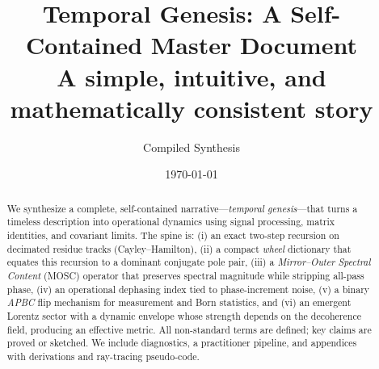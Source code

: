 \documentclass[12pt]{article}
\title{\bf Temporal Genesis: A Self-Contained Master Document\\
\large A simple, intuitive, and mathematically consistent story}
\author{Compiled Synthesis}
\date{\today}
\theoremstyle{definition}
\begin{document}
\maketitle
\tableofcontents

\begin{abstract}
We synthesize a complete, self-contained narrative---\emph{temporal genesis}---that turns a timeless description into operational dynamics using signal processing, matrix identities, and covariant limits. The spine is: (i) an exact two-step recursion on decimated residue tracks (Cayley--Hamilton), (ii) a compact \emph{wheel} dictionary that equates this recursion to a dominant conjugate pole pair, (iii) a \emph{Mirror--Outer Spectral Content} (MOSC) operator that preserves spectral magnitude while stripping all-pass phase, (iv) an operational dephasing index tied to phase-increment noise, (v) a binary \emph{APBC} flip mechanism for measurement and Born statistics, and (vi) an emergent Lorentz sector with a dynamic envelope whose strength depends on the decoherence field, producing an effective metric. All non-standard terms are defined; key claims are proved or sketched. We include diagnostics, a practitioner pipeline, and appendices with derivations and ray-tracing pseudo-code.
\end{abstract}
\end{document}
